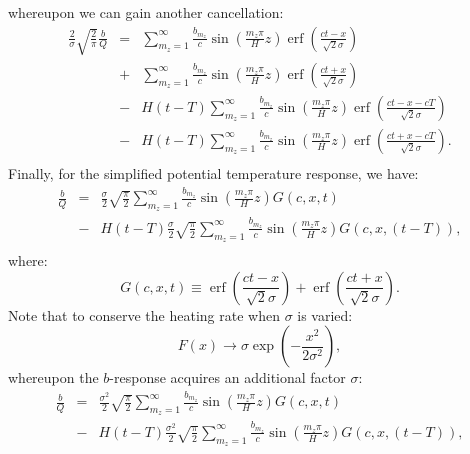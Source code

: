 \documentclass[12pt]{article}
\DeclareMathOperator\erf {erf}
\begin{document}
%
whereupon we can gain another cancellation:
%
\begin{eqnarray}
 \frac{2}{\sigma} \sqrt{ \frac{2} {\pi}} \frac{b}{Q}  & = &\sum_{m_z = 1}^{\infty}\frac{ b_{m_z}}{c} \sin \left( \frac{m_z \pi} {H} z\right) \erf \left( \frac{ct-x}{\sqrt{2} \sigma} \right)   \\ \nonumber
& + &\sum_{m_z = 1}^{\infty} \frac{ b_{m_z}}{c}  \sin \left( \frac{m_z \pi} {H} z\right) \erf \left( \frac{ct+x }{\sqrt{2} \sigma} \right) \\ \nonumber
& - & H(t-T) \sum_{m_z = 1}^{\infty}\frac{ b_{m_z}}{c} \sin \left( \frac{m_z \pi} {H} z\right) \erf \left( \frac{ct-x-cT}{\sqrt{2} \sigma} \right)  \\ \nonumber
& - & H(t-T)  \sum_{m_z = 1}^{\infty} \frac{ b_{m_z}}{c}  \sin \left( \frac{m_z \pi} {H} z\right) \erf \left( \frac{ct +x-cT}{\sqrt{2} \sigma} \right). \\ \nonumber
\end{eqnarray}
%
Finally, for the simplified potential temperature response, we have:
%
\begin{eqnarray}
 \frac{b}{Q}  & = & \frac{\sigma}{2} \sqrt{ \frac {\pi} {2}}  \sum_{m_z = 1}^{\infty} \frac{ b_{m_z}}{c} \sin \left( \frac{m_z \pi} {H} z\right) G(c,x,t)    \\ \nonumber
 & - & H(t-T) \frac{\sigma }{2} \sqrt{ \frac {\pi} {2}}  \sum_{m_z = 1}^{\infty}\frac{ b_{m_z}}{c} \sin \left( \frac{m_z \pi} {H} z\right) G(c,x,(t-T)), \\ \nonumber
 \end{eqnarray}
%
where:
%
\begin{equation}
 G(c,x,t)  \equiv \erf \left( \frac{ct-x}{\sqrt{2} \sigma} \right) +  \erf \left( \frac{ct+x }{\sqrt{2} \sigma} \right) .
\end{equation}
%
Note that to conserve the heating rate when $\sigma$ is varied:
%
\begin{equation}
F(x) \rightarrow \sigma \exp \left( - \frac{x^2}{2 \sigma^2 } \right), 
\end{equation}
%
whereupon the $b$-response acquires an additional factor $\sigma$:
%
\begin{eqnarray}
 \frac{b}{Q}  & = & \frac{\sigma^2}{2} \sqrt{ \frac {\pi} {2}}  \sum_{m_z = 1}^{\infty} \frac{ b_{m_z}}{c} \sin \left( \frac{m_z \pi} {H} z\right) G(c,x,t)    \\ \nonumber
 & - & H(t-T) \frac{\sigma^2}{2} \sqrt{ \frac {\pi} {2}} \sum_{m_z = 1}^{\infty}\frac{ b_{m_z}}{c} \sin \left( \frac{m_z \pi} {H} z\right) G(c,x,(t-T)), \\ \nonumber
 \end{eqnarray}
%
\end{document}
